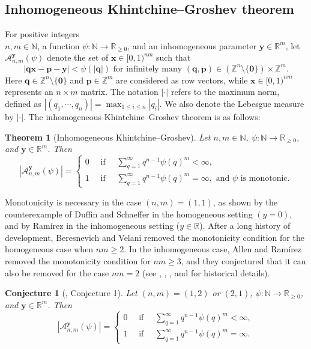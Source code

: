 \documentclass[reqno]{amsart}
\newtheorem*{theorem*}{Theorem}
\newtheorem*{conjecture*}{Conjecture}
\theoremstyle{definition}
\theoremstyle{remark}
\begin{document}
\subsection{Inhomogeneous Khintchine--Groshev theorem}
For positive integers \\ $n,m \in \mathbb{N}$, a function $\psi : \mathbb{N} \to \mathbb{R}_{\geq 0}$, and an inhomogeneous parameter $\mathbf{y} \in \mathbb{R}^m$, let $\mathscr{A}^\mathbf{y}_{n,m}(\psi)$ denote the set of $\mathbf{x} \in [0,1)^{nm}$ such that
$$|\mathbf{qx} - \mathbf{p} - \mathbf{y}| < \psi(|\mathbf{q}|) \text{ for infinitely many } (\mathbf{q}, \mathbf{p}) \in (\mathbb{Z}^n \setminus \{\mathbf{0}\}) \times \mathbb{Z}^m.$$
Here $\mathbf{q} \in \mathbb{Z}^n \setminus \{\mathbf{0}\}$ and $\mathbf{p} \in \mathbb{Z}^m$ are considered as row vectors, while $\mathbf{x} \in [0,1)^{nm}$ represents an $n \times m$ matrix. The notation $|\cdot|$ refers to the maximum norm, defined as $|(q_1, \cdots, q_n)| = \max_{1\leq i \leq n}|q_i|.$ We also denote the Lebesgue measure by $|\cdot|$. The inhomogeneous Khintchine--Groshev theorem is as follows:
\begin{theorem*}[Inhomogeneous Khintchine--Groshev]
    Let $n,m \in \mathbb{N}$, $\psi : \mathbb{N} \to \mathbb{R}_{\geq 0}$, and $\mathbf{y} \in \mathbb{R}^m$. Then
    $$|\mathscr{A}_{n,m}^\mathbf{y} (\psi)| = \begin{cases}  0  \quad \text{ if } \quad \sum_{q=1}^\infty q^{n-1} \psi(q)^m < \infty, \\ 1 \quad \text{ if } \quad \sum_{q=1}^\infty q^{n-1} \psi(q)^m = \infty, \text{ and }\psi \text{ is monotonic.}    \end{cases}$$
\end{theorem*}

Monotonicity is necessary in the case $(n,m) =(1,1)$, as shown by the counterexample of Duffin and Schaeffer \cite{DS41} in the homogeneous setting $(y=0)$, and by Ram\'irez \cite{Ram17} in the inhomogeneous setting ($y \in \mathbb{R}$). After a long history of development, Beresnevich and Velani \cite{BV09} removed the monotonicity condition for the homogeneous case when $nm \geq 2$. In the inhomogeneous case, Allen and Ram\'irez \cite{AR22} removed the monotonicity condition for $nm\geq 3$, and they conjectured that it can also be removed for the case $nm =2$ (see \cite{Gal65}, \cite{Spr79}, \cite{Yu21}, and \cite{AR22} for historical details).
\begin{conjecture*}[\cite{AR22}, Conjecture 1]
    Let $(n,m) = (1,2)$ or $(2,1)$, $\psi: \mathbb{N} \to \mathbb{R}_{\geq 0}$, and $\mathbf{y} \in \mathbb{R}^m$. Then
    $$|\mathscr{A}_{n,m}^\mathbf{y} (\psi)| = \begin{cases}  0  \quad \text{ if } \quad \sum_{q=1}^\infty q^{n-1} \psi(q)^m < \infty, \\ 1 \quad \text{ if } \quad \sum_{q=1}^\infty q^{n-1} \psi(q)^m = \infty. \end{cases}$$
\end{conjecture*}
\end{document}
